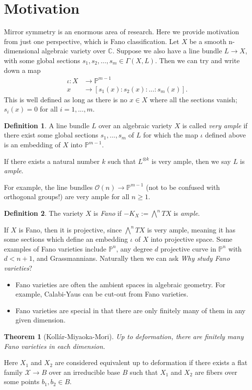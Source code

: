 \documentclass{article}
\title{}
\author{}
\newtheorem{thm}{Theorem}
\theoremstyle{definition}
\newtheorem{defn}{Definition}
\newcommand{\C}{\mathbb{C}}
\newcommand{\bP}{\mathbb{P}}
\newcommand{\OO}{\mathcal{O}}
\begin{document}
\section{Motivation}
Mirror symmetry is an enormous area of research. Here we provide motivation from just one perspective, which is Fano classification. Let $X$ be a smooth n-dimensional algebraic variety over $\C$. Suppose we also have a line bundle $L \to X$, with some global sections $s_1, s_2,...,s_m \in \Gamma(X,L)$. Then we can try and write down a map
\begin{align*}
	\iota: X &\rightarrow \bP^{m-1}\\
	x &\rightarrow [s_1(x):s_2(x):...:s_m(x)].
\end{align*}
This is well defined as long as there is no $x \in X$ where all the sections vanish; $s_i(x)=0$ for all $i=1,...,m$.
\begin{defn}
	A line bundle $L$ over an algebraic variety $X$ is called \emph{very ample} if there exist some global sections $s_1,...,s_m$ of $L$ for which the map $\iota$ defined above is an embedding of $X$ into $\bP^{m-1}$. \vspace{1em}
	
	If there exists a natural number $k$ such that $L^{\otimes k}$ is very ample, then we say $L$ is \emph{ample}.
\end{defn}
For example, the line bundles $\OO(n) \rightarrow \bP^{m-1}$ (not to be confused with orthogonal groups!) are very ample for all $n\geq 1$.
\begin{defn}
	The variety $X$ is \emph{Fano} if $-K_X := \bigwedge^n TX$ is \emph{ample}.	
\end{defn}
If $X$ is Fano, then it is projective, since $\bigwedge^n TX$ is very ample, meaning it has some sections which define an embedding $\iota$ of $X$ into projective space. Some examples of Fano varieties include $\bP^{n}$, any degree $d$ projective curve in $\bP^n$ with $d<n+1$, and Grassmannians. Naturally then we can ask \emph{Why study Fano varieties}? 
\begin{itemize}
	\item Fano varieties are often the ambient spaces in algebraic geometry. For example, Calabi-Yaus can be cut-out from Fano varieties.
	\item Fano varieties are special in that there are only finitely many of them in any given dimension.
\end{itemize}
\begin{thm}[Koll\'ar-Miyaoka-Mori]
	Up to \emph{deformation}, there are finitely many Fano varieties in each dimension.
\end{thm}
Here $X_1$ and $X_2$ are considered equivalent up to deformation if there exists a flat family $\mathcal{X}\to B$ over an irreducible base $B$ such that $X_1$ and $X_2$ are fibers over some points $b_1, b_2 \in B$. \vspace{1em}
\end{document}
